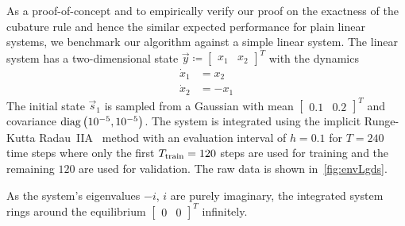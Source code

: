 			As a proof-of-concept and to empirically verify our proof on the exactness of the cubature rule and hence the similar expected performance for plain linear systems, we benchmark our algorithm against a simple linear system. The linear system has a two-dimensional state \( \vec{y} \coloneqq \begin{bmatrix} x_1 & x_2 \end{bmatrix}^T \) with the dynamics
			\begin{align*}
				\dot{x}_1 &= x_2 \\
				\dot{x}_2 &= -x_1
			\end{align*}
			The initial state \( \vec{s}_1 \) is sampled from a Gaussian with mean \( \begin{bmatrix} 0.1 & 0.2 \end{bmatrix}^T \) and covariance \( \operatorname{diag}\big(10^{-5}, 10^{-5}\big) \). The system is integrated using the implicit Runge-Kutta Radau~IIA~\cite{guglielmiImplementingRadauIIA2001} method with an evaluation interval of \( h = 0.1 \) for \( T = 240 \) time steps where only the first \( T_{\mathrm{train}} = 120 \) steps are used for training and the remaining \(120\) are used for validation. The raw data is shown in~\autoref{fig:envLgds}.

			As the system's eigenvalues \( -i \), \( i \) are purely imaginary, the integrated system rings around the equilibrium \( \begin{bmatrix} 0 & 0 \end{bmatrix}^T \) infinitely.

